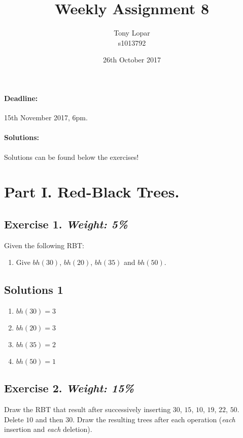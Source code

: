 \documentclass{article}
\begin{document}
\title{Weekly Assignment 8}
\date{26th October 2017}
\author{Tony Lopar \\ s1013792}
\maketitle

\paragraph{Deadline:} 15th November 2017, 6pm.
\paragraph{Solutions:} Solutions can be found below the exercises!

\section*{Part I. Red-Black Trees.}




\subsection*{Exercise 1. \textit{Weight: 5\%}}
Given the following RBT:

\begin{enumerate}
	\item Give $bh(30)$, $bh(20)$, $bh(35)$ and $bh(50)$.
\end{enumerate}

\subsection*{Solutions 1}
\begin{enumerate}
	\item $bh(30) = 3$
	\item $bh(20) = 3$
	\item $bh(35) = 2$
	\item $bh(50) = 1$

\end{enumerate}

\newpage
\subsection*{Exercise 2. \textit{Weight: 15\%}}
Draw the RBT that result after successively inserting $30$, $15$, $10$, $19$, $22$, $50$. Delete $10$ and then $30$. Draw the resulting trees after each operation (\textit{each} insertion and \textit{each} deletion).
\end{document}
